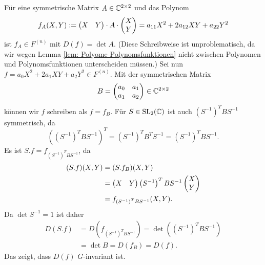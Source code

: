 \documentclass[a4paper,10pt]{article}
\begin{document}
\subsection{}
Für eine symmetrische Matrix $A \in \mathbb{C}^{2 \times 2}$ und das Polynom
\[
 f_A(X,Y) := \begin{pmatrix}X & Y\end{pmatrix} \cdot A \cdot \begin{pmatrix}X\\Y\end{pmatrix} = a_{11} X^2 + 2 a_{12} X Y + a_{22} Y^2
\]
ist $f_A \in F^{(n)}$ mit $D(f) = \det A$. (Diese Schreibweise ist unproblematisch, da wir wegen Lemma \ref{lem: Polyome Polynomsfunktionen} nicht zwischen Polynomen und Polynomsfunktionen unterscheiden müssen.) Sei nun $f = a_0 X^2 + 2 a_1 X Y + a_2 Y^2 \in F^{(n)}$. Mit der symmetrischen Matrix
\[
 B = \begin{pmatrix}a_0 & a_1 \\ a_1 & a_2\end{pmatrix} \in \mathbb{C}^{2 \times 2}
\]
können wir $f$ schreiben als $f = f_B$. Für $S \in \operatorname{SL}_2(\mathbb{C})$ ist auch $\left(S^{-1}\right)^T B S^{-1}$ symmetrisch, da
\[
 \left( \left(S^{-1}\right)^T B S^{-1} \right)^T = \left(S^{-1}\right)^T B^T S^{-1} = \left(S^{-1}\right)^T B S^{-1}.
\]
Es ist $S.f = f_{\left(S^{-1}\right)^T B S^{-1}}$, da
\begin{align*}
 (S.f)(X,Y)
 &= (S.f_B)(X,Y) \\
 &= \begin{pmatrix}X & Y\end{pmatrix} \left(S^{-1}\right)^T B S^{-1} \begin{pmatrix}X \\ Y\end{pmatrix} \\
 &= f_{\left(S^{-1}\right)^T B S^{-1}}(X,Y).
\end{align*}
Da $\det S^{-1} = 1$ ist daher
\begin{align*}
 D(S.f)
 &= D\left(f_{\left(S^{-1}\right)^T B S^{-1}}\right)
 = \det\left(\left(S^{-1}\right)^T B S^{-1}\right) \\
 &= \det B
 = D(f_B)
 = D(f).
\end{align*}
Das zeigt, dass $D(f)$ $G$-invariant ist.
\end{document}
